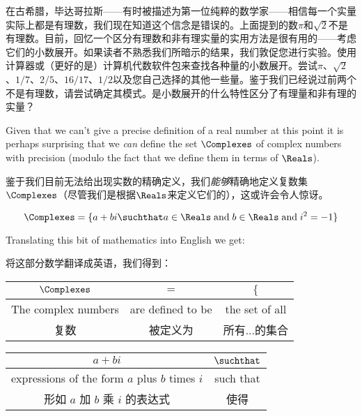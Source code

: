 在古希腊，毕达哥拉斯——有时被描述为第一位纯粹的数学家——相信每一个实量实际上都是有理数，我们现在知道这个信念是错误的。上面提到的数$\pi$和$\sqrt{2}$不是有理数。目前，回忆一个区分有理数和非有理实量的实用方法是很有用的——考虑它们的小数展开。如果读者不熟悉我们所暗示的结果，我们敦促您进行实验。使用计算器或（更好的是）计算机代数软件包来查找各种量的小数展开。尝试$\pi$、$\sqrt{2}$、$1/7$、$2/5$、$16/17$、$1/2$以及您自己选择的其他一些量。鉴于我们已经说过前两个不是有理数，请尝试确定其模式。是小数展开的什么特性区分了有理量和非有理的实量？

Given that we can't give a precise definition of a real number at this
point it is perhaps surprising that we {\em can} define the set
$\Complexes$ of complex numbers with precision 
(modulo the fact that we define them in terms of $\Reals$).

鉴于我们目前无法给出现实数的精确定义，我们{\em 能够}精确地定义复数集$\Complexes$（尽管我们是根据$\Reals$来定义它们的），这或许会令人惊讶。

\[ \Complexes = \{ a + bi \suchthat a \in \Reals \; \mbox{and} \; b \in
\Reals \; \mbox{and} \; i^2 = -1 \} \]

Translating this bit of mathematics into English we get: 

将这部分数学翻译成英语，我们得到：

\vspace{.2in}

\begin{tabular}{c|c|c}
\rule[-10pt]{0pt}{22pt} $\Complexes$ & $=$ & $\{$  \\ \hline
\rule[-6pt]{0pt}{22pt} The complex numbers & are defined to be & the set of all\\
\rule[-6pt]{0pt}{22pt} 复数 & 被定义为 & 所有...的集合\\
\end{tabular}

\vspace{.2in}

\begin{tabular}{c|c}
\rule[-10pt]{0pt}{22pt} $a+bi$ & $\suchthat$ \\ \hline
\rule[-6pt]{0pt}{22pt} expressions of the form $a$ plus $b$ times $i$ & such that \\
\rule[-6pt]{0pt}{22pt} 形如 $a$ 加 $b$ 乘 $i$ 的表达式 & 使得 \\
\end{tabular}

\vspace{.2in}

